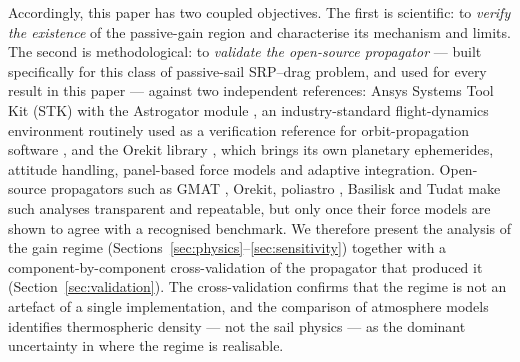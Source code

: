 \vspace{0.5em}
\par\noindent Accordingly, this paper has two coupled objectives. The first is scientific: to \emph{verify the existence} of the passive-gain region and characterise its mechanism and limits. The second is methodological: to \emph{validate the open-source propagator} --- built specifically for this class of passive-sail SRP--drag problem, and used for every result in this paper --- against two independent references: Ansys Systems Tool Kit (STK) with the Astrogator module \citep{ansysSTK2024,shortRevisitingTrajectory2019}, an industry-standard flight-dynamics environment routinely used as a verification reference for orbit-propagation software \citep{refaatPropagatorValidation2018,hughesGMATVV2014}, and the Orekit library \citep{orekit}, which brings its own planetary ephemerides, attitude handling, panel-based force models and adaptive integration. Open-source propagators such as GMAT \citep{hughesGMATVV2014}, Orekit, poliastro \citep{canoPoliastro2022}, Basilisk \citep{kenneallyBasilisk2020} and Tudat \citep{dirkxTudatpy2022} make such analyses transparent and repeatable, but only once their force models are shown to agree with a recognised benchmark. We therefore present the analysis of the gain regime (Sections~\ref{sec:physics}--\ref{sec:sensitivity}) together with a component-by-component cross-validation of the propagator that produced it (Section~\ref{sec:validation}). The cross-validation confirms that the regime is not an artefact of a single implementation, and the comparison of atmosphere models identifies thermospheric density --- not the sail physics --- as the dominant uncertainty in where the regime is realisable.
\FloatBarrier